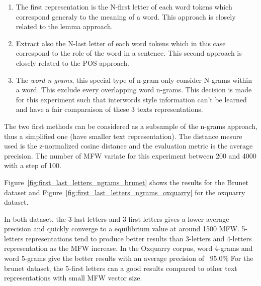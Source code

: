 \begin{enumerate}
  \item
  The first representation is the N-first letter of each word tokens which correspond generaly to the meaning of a word.
  This approach is closely related to the lemma approach.
  \item
  Extract also the N-last letter of each word tokens which in this case correspond to the role of the word in a sentence.
  This second approach is closely related to the POS approach.
  \item
  The \textit{word n-grams}, this special type of n-gram only consider N-grams within a word.
  This exclude every overlapping word n-grams.
  This decision is made for this experiment such that interwords style information can't be learned and have a fair comparaison of these 3 texts representations.
\end{enumerate}
The two first methods can be considered as a subsample of the n-grams approach, thus a simplified one (have smaller text representation).
The distance mesure used is the z-normalized cosine distance and the evaluation metric is the average precision.
The number of MFW variate for this experiment between 200 and 4000 with a step of 100.

Figure~\ref{fig:first_last_letters_ngrams_brunet} shows the results for the Brunet dataset and Figure~\ref{fig:first_last_letters_ngrams_oxquarry} for the oxquarry dataset.

In both dataset, the 3-last letters and 3-first letters gives a lower average precision and quickly converge to a equilibrium value at around 1500 MFW.
5-letters representations tend to produce better results than 3-letters and 4-letters representation as the MFW increase.
In the Oxquarry corpus, word 4-grams and word 5-grams give the better results with an average precision of ~95.0\%
For the brunet dataset, the 5-first letters can a good results compared to other text representations with small MFW vector size.


